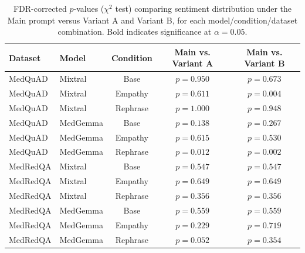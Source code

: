\begin{table}[t]
\centering
\caption{FDR-corrected $p$-values ($\chi^2$ test) comparing sentiment distribution under the Main prompt versus Variant A and Variant B, for each model/condition/dataset combination. Bold indicates significance at $\alpha=0.05$.}
\label{tab:ablation_pvalues_sentiment}
\begin{tabular}{llccc}
\toprule
\textbf{Dataset} & \textbf{Model} & \textbf{Condition} & \textbf{Main vs. Variant A} & \textbf{Main vs. Variant B} \\
\midrule
MedQuAD & Mixtral & Base & $p=0.950$ & $p=0.673$ \\
MedQuAD & Mixtral & Empathy & $p=0.611$ & \textbf{$p=0.004$} \\
MedQuAD & Mixtral & Rephrase & $p=1.000$ & $p=0.948$ \\
MedQuAD & MedGemma & Base & $p=0.138$ & $p=0.267$ \\
MedQuAD & MedGemma & Empathy & $p=0.615$ & $p=0.530$ \\
MedQuAD & MedGemma & Rephrase & \textbf{$p=0.012$} & \textbf{$p=0.002$} \\
MedRedQA & Mixtral & Base & $p=0.547$ & $p=0.547$ \\
MedRedQA & Mixtral & Empathy & $p=0.649$ & $p=0.649$ \\
MedRedQA & Mixtral & Rephrase & $p=0.356$ & $p=0.356$ \\
MedRedQA & MedGemma & Base & $p=0.559$ & $p=0.559$ \\
MedRedQA & MedGemma & Empathy & $p=0.229$ & $p=0.719$ \\
MedRedQA & MedGemma & Rephrase & $p=0.052$ & $p=0.354$ \\
\bottomrule
\end{tabular}
\end{table}

